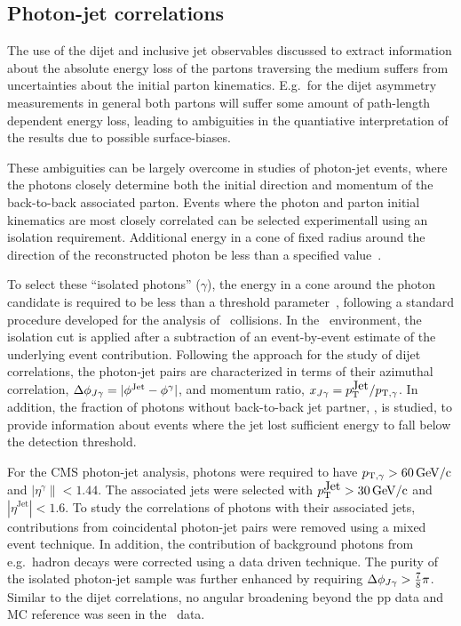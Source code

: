 \subsection{Photon-jet correlations}

The use of the dijet and inclusive jet observables discussed to extract information
about the absolute energy loss of the partons traversing the medium suffers from
uncertainties about the initial parton kinematics. E.g.\ for the dijet asymmetry 
measurements in general both partons will suffer some amount of path-length dependent
energy loss, leading to ambiguities in the quantiative interpretation of the results
due to possible surface-biases. 

These ambiguities can be largely overcome in studies of photon-jet events, 
where the photons closely determine both the initial direction and momentum 
of the back-to-back associated parton.
Events where the photon and parton initial kinematics are most closely correlated 
can be selected experimentall using an isolation requirement. Additional energy
in a cone of fixed radius around the direction of the reconstructed
photon be less than a specified value~\cite{HIPhoton}. 

To select these ``isolated photons'' ($\gamma$), the energy in a cone around 
the photon candidate is required to be less than a threshold parameter~\cite{HIPhoton},
following a standard procedure developed for the analysis of \pp\ collisions. In the \PbPb\ 
environment, the isolation cut is applied after a subtraction of an event-by-event 
estimate of the underlying event contribution.
Following the approach for the study of dijet correlations, the photon-jet pairs 
are characterized in terms of their azimuthal correlation, $\Delta\phi_{J\gamma} = |\phi^\mathrm{Jet} - \phi^{\gamma}|$,
 and momentum ratio, $x_{J\gamma} = p_{\mathrm{T}}^{\mbox{Jet}}/p_{\mathrm{T},\gamma}$. In addition, the fraction of photons without 
back-to-back jet partner,  \rjg, is studied, to provide information about 
events where the jet lost sufficient energy to fall below the detection threshold.

For the CMS photon-jet analysis, photons were required to have $p_{\mathrm{T},\gamma} > 60\,\mathrm{GeV/c}$
and  $|\eta^\gamma\|<1.44$. The associated jets were selected with
$p_{\mathrm{T}}^{\mbox{Jet}} > 30\,\mathrm{GeV/c}$ and $|\eta^{\mbox{Jet}}|<1.6$. To study the correlations of 
photons with their associated jets, contributions from 
coincidental photon-jet pairs were removed using a mixed event technique. In 
addition, the contribution of background photons from e.g.\ hadron decays 
were corrected using a data driven technique. The purity of the isolated photon-jet
sample was further enhanced by requiring $\Delta\phi_{J\gamma} > \frac{7}{8}\pi$.
Similar to the dijet correlations, no angular broadening 
beyond the pp data and MC reference was seen in the \PbPb\ data.

